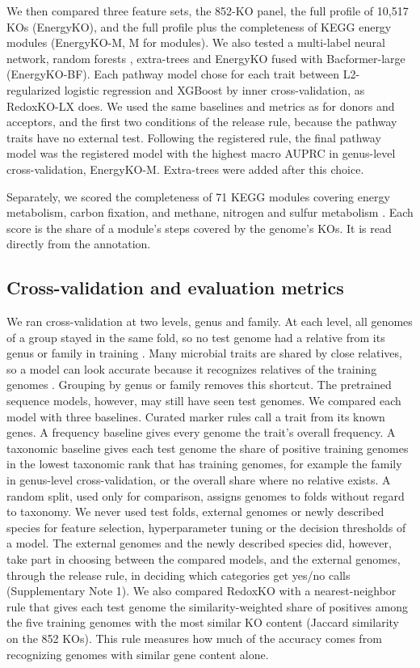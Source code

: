 \documentclass[10pt,a4paper,onecolumn]{article}
\begin{document}
We then compared three feature sets, the 852-KO panel, the full profile
of 10,517 KOs (EnergyKO), and the full profile plus the completeness of
KEGG energy modules (EnergyKO-M, M for modules). We also tested a
multi-label neural network, random forests \autocite{Breiman2001},
extra-trees \autocite{Geurts2006} and EnergyKO fused with
Bacformer-large (EnergyKO-BF). Each pathway model chose for each trait
between L2-regularized logistic regression and XGBoost by inner
cross-validation, as RedoxKO-LX does. We used the same baselines and
metrics as for donors and acceptors, and the first two conditions of the
release rule, because the pathway traits have no external test.
Following the registered rule, the final pathway model was the
registered model with the highest macro AUPRC in genus-level
cross-validation, EnergyKO-M. Extra-trees were added after this choice.

Separately, we scored the completeness of 71 KEGG modules covering
energy metabolism, carbon fixation, and methane, nitrogen and sulfur
metabolism \autocite{Kanehisa2025}. Each score is the share of a
module's steps covered by the genome's KOs. It is read directly from the
annotation.

\subsection{Cross-validation and evaluation
metrics}\label{cross-validation-and-evaluation-metrics}

We ran cross-validation at two levels, genus and family. At each level,
all genomes of a group stayed in the same fold, so no test genome had a
relative from its genus or family in training \autocite{Roberts2017}.
Many microbial traits are shared by close relatives, so a model can look
accurate because it recognizes relatives of the training genomes
\autocite{Goberna2016}. Grouping by genus or family removes this
shortcut. The pretrained sequence models, however, may still have seen
test genomes. We compared each model with three baselines. Curated
marker rules call a trait from its known genes. A frequency baseline
gives every genome the trait's overall frequency. A taxonomic baseline
gives each test genome the share of positive training genomes in the
lowest taxonomic rank that has training genomes, for example the family
in genus-level cross-validation, or the overall share where no relative
exists. A random split, used only for comparison, assigns genomes to
folds without regard to taxonomy. We never used test folds, external
genomes or newly described species for feature selection, hyperparameter
tuning or the decision thresholds of a model. The external genomes and
the newly described species did, however, take part in choosing between
the compared models, and the external genomes, through the release rule,
in deciding which categories get yes/no calls (Supplementary Note 1). We
also compared RedoxKO with a nearest-neighbor rule that gives each test
genome the similarity-weighted share of positives among the five
training genomes with the most similar KO content (Jaccard similarity on
the 852 KOs). This rule measures how much of the accuracy comes from
recognizing genomes with similar gene content alone.
\end{document}
